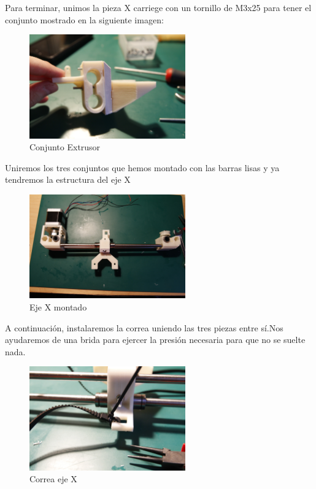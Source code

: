 			Para terminar, unimos la pieza X carriege con un tornillo de M3x25 para tener el conjunto mostrado en la siguiente imagen:
			\begin{figure}[!htp]
				\centering
				\includegraphics[width=0.6\textwidth]{../../Fotos/60.jpg}
				\caption{Conjunto Extrusor}
			\end{figure}
			Uniremos los tres conjuntos que hemos montado con las barras lisas y ya tendremos la estructura del eje X
			\begin{figure}[!htp]
				\centering
				\includegraphics[width=0.6\textwidth]{../../Fotos/64.jpg}
				\caption{Eje X montado}
			\end{figure}
			A continuación, instalaremos la correa uniendo las tres piezas entre sí.Nos ayudaremos de una brida para ejercer la presión necesaria para que no se suelte nada.
			\begin{figure}[!htp]
				\centering
				\includegraphics[width=0.6\textwidth]{../../Fotos/65.jpg}
				\caption{Correa eje X}
			\end{figure}
